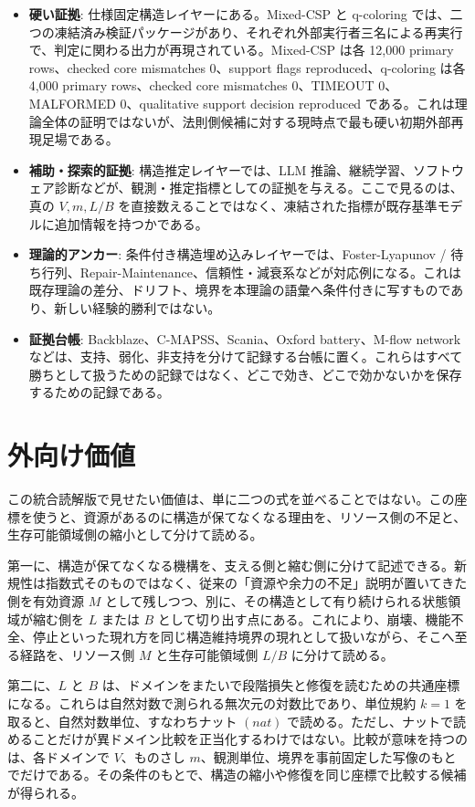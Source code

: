 \documentclass[12pt,a4paper]{article}
\begin{document}
\begin{itemize}
\tightlist
\item
  \textbf{硬い証拠}: 仕様固定構造レイヤーにある。Mixed-CSP と q-coloring では、二つの凍結済み検証パッケージがあり、それぞれ外部実行者三名による再実行で、判定に関わる出力が再現されている。Mixed-CSP は各 12,000 primary rows、checked core mismatches 0、support flags reproduced、q-coloring は各 4,000 primary rows、checked core mismatches 0、TIMEOUT 0、MALFORMED 0、qualitative support decision reproduced である。これは理論全体の証明ではないが、法則側候補に対する現時点で最も硬い初期外部再現足場である。
\item
  \textbf{補助・探索的証拠}: 構造推定レイヤーでは、LLM 推論、継続学習、ソフトウェア診断などが、観測・推定指標としての証拠を与える。ここで見るのは、真の \(V,m,L/B\) を直接数えることではなく、凍結された指標が既存基準モデルに追加情報を持つかである。
\item
  \textbf{理論的アンカー}: 条件付き構造埋め込みレイヤーでは、Foster-Lyapunov / 待ち行列、Repair-Maintenance、信頼性・減衰系などが対応例になる。これは既存理論の差分、ドリフト、境界を本理論の語彙へ条件付きに写すものであり、新しい経験的勝利ではない。
\item
  \textbf{証拠台帳}: Backblaze、C-MAPSS、Scania、Oxford battery、M-flow network などは、支持、弱化、非支持を分けて記録する台帳に置く。これらはすべて勝ちとして扱うための記録ではなく、どこで効き、どこで効かないかを保存するための記録である。
\end{itemize}

\section{外向け価値}\label{ux5916ux5411ux3051ux4fa1ux5024}

この統合読解版で見せたい価値は、単に二つの式を並べることではない。この座標を使うと、資源があるのに構造が保てなくなる理由を、リソース側の不足と、生存可能領域側の縮小として分けて読める。

第一に、構造が保てなくなる機構を、支える側と縮む側に分けて記述できる。新規性は指数式そのものではなく、従来の「資源や余力の不足」説明が置いてきた側を有効資源 \(M\) として残しつつ、別に、その構造として有り続けられる状態領域が縮む側を \(L\) または \(B\) として切り出す点にある。これにより、崩壊、機能不全、停止といった現れ方を同じ構造維持境界の現れとして扱いながら、そこへ至る経路を、リソース側 \(M\) と生存可能領域側 \(L/B\) に分けて読める。

第二に、\(L\) と \(B\) は、ドメインをまたいで段階損失と修復を読むための共通座標になる。これらは自然対数で測られる無次元の対数比であり、単位規約 \(k=1\) を取ると、自然対数単位、すなわちナット \((nat)\) で読める。ただし、ナットで読めることだけが異ドメイン比較を正当化するわけではない。比較が意味を持つのは、各ドメインで \(V\)、ものさし \(m\)、観測単位、境界を事前固定した写像のもとでだけである。その条件のもとで、構造の縮小や修復を同じ座標で比較する候補が得られる。
\end{document}
